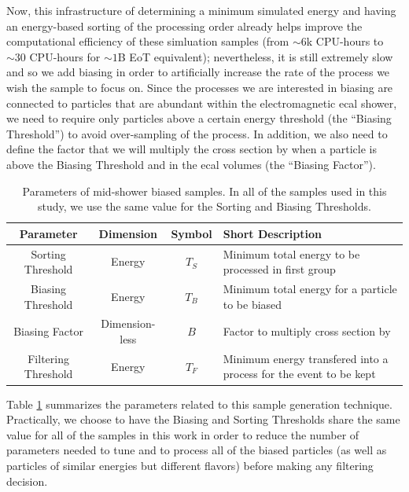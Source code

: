 Now, this infrastructure of determining a minimum simulated energy and having an energy-based
sorting of the processing order already helps improve the computational efficiency of these 
simluation samples (from $\sim 6$k CPU-hours to $\sim 30$ CPU-hours for $\sim 1$B EoT equivalent); 
nevertheless, it is still extremely slow and so we add biasing in order to artificially increase 
the rate of the process we wish the sample to focus on.
Since the processes we are interested in biasing are connected to particles that are abundant
within the electromagnetic \ac{ecal} shower, we need to require only particles above a
certain energy threshold (the ``Biasing Threshold'') to avoid over-sampling of the process.
In addition, we also need to define the factor that we will multiply the cross section by
when a particle is above the Biasing Threshold and in the \ac{ecal} volumes (the ``Biasing Factor'').

\begin{table}[htb]
    \centering
    \begin{tabular}{c|cc|p{}}
        Parameter & Dimension & Symbol & Short Description \\ \hline \hline
        Sorting Threshold & Energy & $T_S$ & Minimum total energy to be processed in first group \\ \hline
        Biasing Threshold & Energy & $T_B$ & Minimum total energy for a particle to be biased \\ \hline
        Biasing Factor & Dimension-less & $B$ & Factor to multiply cross section by \\ \hline
        Filtering Threshold & Energy & $T_F$ & Minimum energy transfered into a process for the event to be kept \\
    \end{tabular}
    \caption{Parameters of mid-shower biased samples. In all of the samples used in this study, we use the same value for the Sorting and Biasing Thresholds.}
    \label{tab:biasing-parameters}
\end{table}

Table \ref{tab:biasing-parameters} summarizes the parameters related to this
sample generation technique.
Practically, we choose to have the Biasing and Sorting Thresholds share the same value for all
of the samples in this work in order to reduce the number of parameters needed to tune and
to process all of the biased particles (as well as particles of similar energies
but different flavors) before making any filtering decision.

